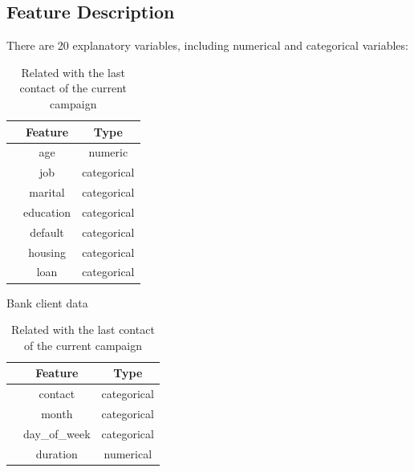 \documentclass[11pt,a4paper]{article}
\newcounter{magicrownumbers}
\newcommand\rownumber{\stepcounter{magicrownumbers}\arabic{magicrownumbers}}
\begin{document}
    \subsection{Feature Description}
    There are 20 explanatory variables, including numerical and categorical variables:
    
    \begin{table}[h]
        \begin{minipage}{.5\linewidth}
            \centering
            \begin{tabular}{r c c}
                 & Feature & Type \\
                \hline \hline
                \rownumber & age & numeric \\
                \rownumber & job & categorical \\
                \rownumber & marital & categorical \\
                \rownumber & education & categorical \\
                \rownumber & default & categorical \\
                \rownumber & housing & categorical \\
                \rownumber & loan & categorical \\
            \end{tabular}
            \caption{Bank client data}\label{tab:bank.client}
        \end{minipage}%
        \begin{minipage}{.5\linewidth}
            \centering
            \begin{tabular}{r c c}
                 & Feature & Type \\
                \hline \hline
                \rownumber & contact & categorical \\
                \rownumber & month & categorical \\
                \rownumber & day\_of\_week & categorical \\
                \rownumber & duration & numerical \\
            \end{tabular}
            \caption{Related with the last contact of the current campaign}\label{tab:last.contact}
        \end{minipage}
    \end{table}
    
\end{document}
